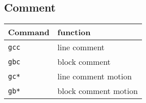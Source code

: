 \subsection*{Comment}
\begin{tabular}{l l}
  \toprule
  Command      & function           \\
  \midrule
  \texttt{gcc} & line comment\\
  \texttt{gbc} & block comment \\
  \texttt{gc*} & line comment motion \\
  \texttt{gb*} & block comment motion\\
  \bottomrule
\end{tabular}
